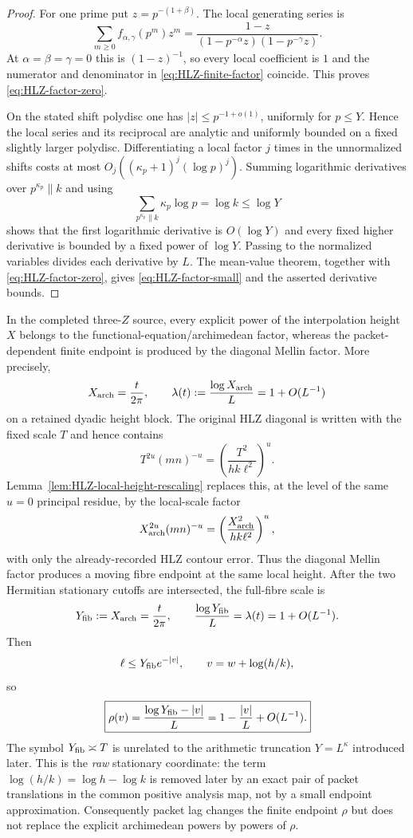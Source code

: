 \begin{proof}
For one prime put $z=p^{-(1+\beta)}$. The local generating series is
\[
\sum_{m\ge0}f_{\alpha,\gamma}(p^m)z^m
=\frac{1-z}{(1-p^{-\alpha}z)(1-p^{-\gamma}z)}.
\]
At $\alpha=\beta=\gamma=0$ this is $(1-z)^{-1}$, so every local coefficient is
$1$ and the numerator and denominator in
\eqref{eq:HLZ-finite-factor} coincide. This proves
\eqref{eq:HLZ-factor-zero}.

On the stated shift polydisc one has $|z|\le p^{-1+o(1)}$, uniformly for
$p\le Y$. Hence the local series and its reciprocal are analytic and uniformly
bounded on a fixed slightly larger polydisc. Differentiating a local factor
$j$ times in the unnormalized shifts costs at most
$O_j((\kappa_p+1)^j(\log p)^j)$. Summing logarithmic derivatives over
$p^{\kappa_p}\parallel k$ and using
\[
\sum_{p^{\kappa_p}\parallel k}\kappa_p\log p=\log k\le\log Y
\]
shows that the first logarithmic derivative is $O(\log Y)$ and every fixed
higher derivative is bounded by a fixed power of $\log Y$. Passing to the
normalized variables divides each derivative by $L$. The mean-value theorem,
together with \eqref{eq:HLZ-factor-zero}, gives
\eqref{eq:HLZ-factor-small} and the asserted derivative bounds.
\end{proof}

\begin{proposition}
\label{prop:X-tagging}
In the completed three-$Z$ source, every explicit power of the interpolation
height $X$ belongs to the functional-equation/archimedean factor, whereas the
packet-dependent finite endpoint is produced by the diagonal Mellin factor.
More precisely,
\[
X_{\rm arch}=\frac{t}{2\pi},
\qquad
\lambda(t):=\frac{\log X_{\rm arch}}L=1+O(L^{-1})
\]
on a retained dyadic height block.  The original HLZ diagonal is written with
the fixed scale $T$ and hence contains
\[
T^{2u}(mn)^{-u}
=\left(\frac{T^2}{hk\ell^2}\right)^u.
\]
Lemma~\ref{lem:HLZ-local-height-rescaling} replaces this, at the level of the
same $u=0$ principal residue, by the local-scale factor
\[
X_{\rm arch}^{2u}(mn)^{-u}
=\left(\frac{X_{\rm arch}^2}{hk\ell^2}\right)^u,
\]
with only the already-recorded HLZ contour error.  Thus the diagonal Mellin
factor produces a moving fibre endpoint at the same local height.  After the
two Hermitian stationary cutoffs are intersected, the full-fibre
scale is
\[
Y_{\rm fib}:=X_{\rm arch}=\frac{t}{2\pi},
\qquad
\frac{\log Y_{\rm fib}}L=\lambda(t)=1+O(L^{-1}).
\]
Then
\[
\ell\le Y_{\rm fib}e^{-|v|},
\qquad
v=w+\log(h/k),
\]
so
\begin{equation}
\boxed{
\rho(v)=\frac{\log Y_{\rm fib}-|v|}{L}
=1-\frac{|v|}{L}+O(L^{-1}).
}
\label{eq:rho-v}
\end{equation}
The symbol $Y_{\rm fib}\asymp T$ is unrelated to the arithmetic truncation
$Y=L^\kappa$ introduced later. This is the \emph{raw} stationary coordinate:
the term $\log(h/k)=\log h-\log k$ is removed later by an exact pair of packet
translations in the common positive analysis map, not by a small endpoint
approximation. Consequently packet lag changes the finite endpoint $\rho$ but
does not replace the explicit archimedean powers by powers of $\rho$.
\end{proposition}

